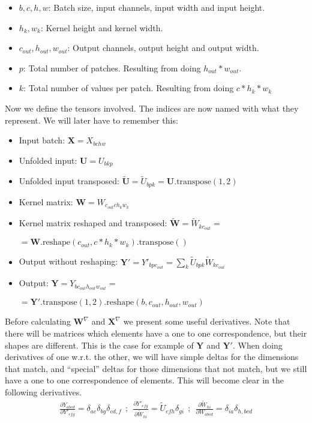 \documentclass{article}
\begin{document}
\begin{itemize}
    \item \(b, c, h, w\): Batch size, input channels, input width and input height.
    \item \( h_k, w_k\): Kernel height and kernel width.
    \item \(c_{out}, h_{out}, w_{out}\): Output channels, output height and output width.
    \item \(p\): Total number of patches. Resulting from doing \(h_{out} * w_{out}\).
    \item \(k\): Total number of values per patch. Resulting from doing \(c * h_k * w_k\)
\end{itemize}

Now we define the tensors involved. The indices are now named with what they represent. We will later have to remember this:
\begin{itemize}
    \item Input batch: \(\mathbf{X} = X_{bchw}\)
    \item Unfolded input: \(\mathbf{U} = U_{bkp}\)
    \item Unfolded input transposed: \(\mathbf{\tilde{U}} = \tilde{U}_{bpk} = \textbf{U}.\text{transpose}(1, 2)\)
    \item Kernel matrix: \(\mathbf{W} = W_{c_{out}ch_kw_k}\)
    \item Kernel matrix reshaped and transposed: \(\mathbf{\tilde{W}} = \tilde{W}_{kc_{out}} = \)
    
    \( = \mathbf{W}.\text{reshape}(c_{out}, c * h_k * w_k).\text{transpose}()\)
    \item Output without reshaping: \(\mathbf{Y}' = Y'_{bpc_{out}} = \sum_k \tilde{U}_{bpk}\tilde{W}_{kc_{out}}\)
    \item Output: \(\mathbf{Y} = Y_{bc_{out}h_{out}w_{out}} = \)
    
    \( = \mathbf{Y}'.\text{transpose}(1, 2).\text{reshape}(b, c_{out}, h_{out}, w_{out})\)
\end{itemize} 

Before calculating \(\mathbf{W}^\nabla\) and \(\mathbf{X}^\nabla\) we present some useful derivatives. Note that there will be matrices which elements have a one to one correspondence, but their shapes are different. This is the case for example of \(\mathbf{Y}\) and \(\mathbf{Y}'\). When doing derivatives of one w.r.t. the other, we will have simple deltas for the dimensions that match, and ``special'' deltas for those dimensions that not match, but we still have a one to one correspondence of elements. This will become clear in the following derivatives.
\begin{align*}
    \frac{\partial Y_{abcd}}{\partial Y'_{efg}} = \delta_{ae}\delta_{bg}\delta_{cd, f} ~~;~~ \frac{\partial Y'_{efg}}{\partial \tilde{W}_{hi}} = \tilde{U}_{efh}\delta_{gi} ~~;~~ \frac{\partial \tilde{W}_{hi}}{\partial W_{abcd}} = \delta_{ia}\delta_{h, bcd}
\end{align*}
\end{document}
